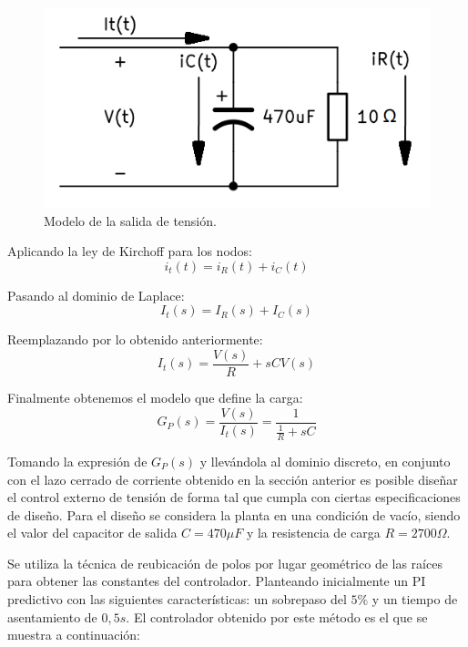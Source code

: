 \begin{figure} [H]
	\centering
	\includegraphics[scale=0.6]{./imagenes/CircuitoRC.png}
	\caption{Modelo de la salida de tensión.}
	\label{F:CircuitoRC}
\end{figure} \par 
Aplicando la ley de Kirchoff para los nodos:
\begin{equation}
i_t(t)=i_R(t)+i_C(t)
\end{equation}\par 
Pasando al dominio de Laplace:
\begin{equation}
I_t(s)=I_R(s)+I_C(s)
\end{equation}\par 
Reemplazando por lo obtenido anteriormente:
\begin{equation}
I_t(s)=\frac{V(s)}{R}+sCV(s)
\end{equation}\par 
Finalmente obtenemos el modelo que define la carga:
\begin{equation}
G_P(s)=\frac{V(s)}{I_t(s)}=\frac{1}{\frac{1}{R}+sC}
\end{equation}\par 
Tomando la expresión de $G_P(s)$ y llevándola al dominio discreto, en conjunto con el lazo cerrado de corriente obtenido en la sección anterior es posible diseñar el control externo de tensión de forma tal que cumpla con ciertas especificaciones de diseño. Para el diseño se considera la planta en una condición de vacío, siendo el valor del capacitor de salida $C=470\mu F$ y la resistencia de carga $R=2700\Omega$. \par 
Se utiliza la técnica de reubicación de polos por lugar geométrico de las raíces para obtener las constantes del controlador. Planteando inicialmente un PI predictivo con las siguientes características: un sobrepaso del $5\%$ y un tiempo de asentamiento de $0,5s$. El controlador obtenido por este método es el que se muestra a continuación:
